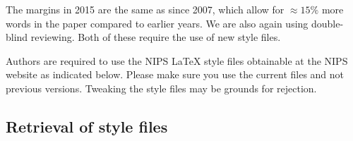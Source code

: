 \documentclass{article} %
\begin{document}
The margins in 2015 are the same as since 2007, which allow for $\approx 15\%$
more words in the paper compared to earlier years. We are also again using 
double-blind reviewing. Both of these require the use of new style files.

Authors are required to use the NIPS \LaTeX{} style files obtainable at the
NIPS website as indicated below. Please make sure you use the current files and
not previous versions. Tweaking the style files may be grounds for rejection.








\subsection{Retrieval of style files}
\end{document}
